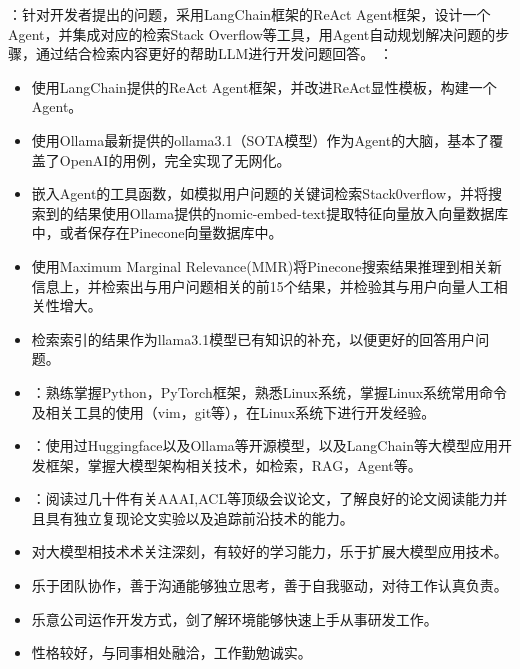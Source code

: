 \vspace{3pt}
：针对开发者提出的问题，采用LangChain框架的ReAct Agent框架，设计一个Agent，并集成对应的检索Stack Overflow等工具，用Agent自动规划解决问题的步骤，通过结合检索内容更好的帮助LLM进行开发问题回答。
\vspace{3pt}
：
\begin{itemize}
  \item 使用LangChain提供的ReAct Agent框架，并改进ReAct显性模板，构建一个Agent。
  \item 使用Ollama最新提供的ollama3.1（SOTA模型）作为Agent的大脑，基本了覆盖了OpenAI的用例，完全实现了无网化。
  \item 嵌入Agent的工具函数，如模拟用户问题的关键词检索Stack0verflow，并将搜索到的结果使用Ollama提供的nomic-embed-text提取特征向量放入向量数据库中，或者保存在Pinecone向量数据库中。
  \item 使用Maximum Marginal Relevance(MMR)将Pinecone搜索结果推理到相关新信息上，并检索出与用户问题相关的前15个结果，并检验其与用户向量人工相关性增大。
  \item 检索索引的结果作为llama3.1模型已有知识的补充，以便更好的回答用户问题。
\end{itemize}

\vspace{5pt}
\vspace{1ex}

\begin{itemize}[parsep=0.5ex]
  \item {}：熟练掌握Python，PyTorch框架，熟悉Linux系统，掌握Linux系统常用命令及相关工具的使用（vim，git等），在Linux系统下进行开发经验。
  \item {}：使用过Huggingface以及Ollama等开源模型，以及LangChain等大模型应用开发框架，掌握大模型架构相关技术，如检索，RAG，Agent等。
  \item {}：阅读过几十件有关AAAI,ACL等顶级会议论文，了解良好的论文阅读能力并且具有独立复现论文实验以及追踪前沿技术的能力。
\end{itemize}

\vspace{5pt}
\vspace{1ex}

\begin{itemize}[parsep=0.5ex]
  \item 对大模型相技术术关注深刻，有较好的学习能力，乐于扩展大模型应用技术。
  \item 乐于团队协作，善于沟通能够独立思考，善于自我驱动，对待工作认真负责。
  \item 乐意公司运作开发方式，剑了解环境能够快速上手从事研发工作。
  \item 性格较好，与同事相处融洽，工作勤勉诚实。
\end{itemize}
